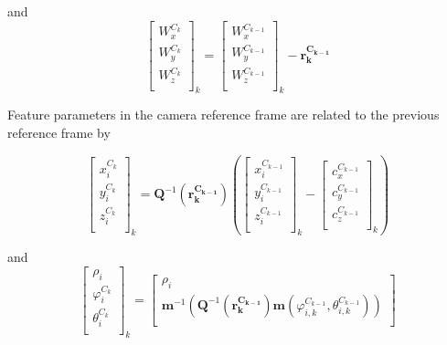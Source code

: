 \noindent and
\begin{equation}
\begin{bmatrix}
W_{x}^{C_{k}} \\
W_{y}^{C_{k}} \\
W_{z}^{C_{k}} \\
\end{bmatrix}_{k}= \begin{bmatrix}
W_{x}^{C_{k-1}} \\
W_{y}^{C_{k-1}} \\
W_{z}^{C_{k-1}} \\
\end{bmatrix}_{k}-\mathbf{r_k^{C_{k-1}}}
\end{equation}
 
Feature parameters in the camera reference frame are related to the
previous reference frame 
by

\begin{equation}
\begin{bmatrix}
x_{i}^{C_{k}} \\
y_{i}^{C_{k}} \\
z_{i}^{C_{k}} \\
\end{bmatrix}_{k}=\mathbf{Q}^{-1}(\mathbf{r_k^{C_{k-1}}})\left(
\begin{bmatrix}
x_{i}^{C_{k-1}} \\
y_{i}^{C_{k-1}} \\
z_{i}^{C_{k-1}} \\
\end{bmatrix}_{k}- \begin{bmatrix}
c_{x}^{C_{k-1}} \\
c_{y}^{C_{k-1}} \\
c_{z}^{C_{k-1}} \\
\end{bmatrix}_{k}\right)
\end{equation}

\noindent and
\begin{equation}
\begin{bmatrix}
\rho_{i} \\
\varphi_{i}^{C_{k}} \\
\theta_{i}^{C_{k}} \\
\end{bmatrix}_{k}=
\begin{bmatrix}
\rho _{i} \\
\mathbf{m}^{-1}\left(\mathbf{Q}^{-1}(\mathbf{r_k^{C_{k-1}}})\mathbf{m}(\varphi _{i, k}^{C_{k-1}}, \theta _{i, k}^{C_{k-1}})\right) \\
\end{bmatrix}
\end{equation}

